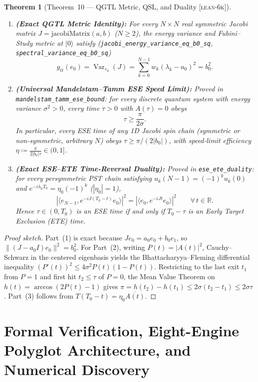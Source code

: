 \documentclass[11pt,reqno]{amsart}
\newtheorem{theorem}{Theorem}[section]
\theoremstyle{definition}
\newcommand{\R}{\mathbb{R}}
\newcommand{\Var}{\operatorname{Var}}
\newcommand{\taglean}{\textsc{[lean-6k]}}
\newcommand{\idb}[1]{\textnormal{\texttt{\footnotesize #1}}}
\newcommand{\ub}{\_\allowbreak}
\begin{document}
\begin{theorem}[Theorem~10 --- QGTL Metric, QSL, and Duality \taglean{}]
\label{thm:qsl}
\leavevmode
\begin{enumerate}
\item \textbf{(Exact QGTL Metric Identity):} For every $N\times N$ real symmetric Jacobi matrix $J=\mathrm{jacobiMatrix}(a,b)$ ($N\ge 2$), the energy variance and Fubini--Study metric at $|0\rangle$ satisfy (\idb{jacobi\ub energy\ub variance\ub eq\ub b0\ub sq}, \idb{spectral\ub variance\ub eq\ub b0\ub sq})
\[
g_{tt}(e_0) = \Var_{e_0}(J) = \sum_{k=0}^{N-1} w_k (\lambda_k - a_0)^2 = b_0^2.
\]
\item \textbf{(Universal Mandelstam--Tamm ESE Speed Limit):} Proved in \idb{mandelstam\ub tamm\ub ese\ub bound}: for every discrete quantum system with energy variance $\sigma^2>0$, every time $\tau>0$ with $A(\tau)=0$ obeys
\[
\tau \ge \frac{\pi}{2\sigma}.
\]
In particular, every ESE time of \emph{any} 1D Jacobi spin chain (symmetric or non-symmetric, arbitrary $N$) obeys $\tau\ge\pi/(2|b_0|)$, with speed-limit efficiency $\eta \coloneqq \frac{\pi}{2|b_0|\tau}\in(0,1]$.
\item \textbf{(Exact ESE--ETE Time-Reversal Duality):} Proved in \idb{ese\ub ete\ub duality}: for every persymmetric PST chain satisfying $u_k(N-1)=(-1)^k u_k(0)$ and $e^{-i\lambda_k T_0}=\eta_0(-1)^k$ ($|\eta_0|=1$),
\[
|\langle e_{N-1}, e^{-iJ(T_0-t)} e_0\rangle|^2 = |\langle e_0, e^{-iJt} e_0\rangle|^2 \qquad \forall\,t\in\R.
\]
Hence $\tau\in(0,T_0)$ is an ESE time if and only if $T_0-\tau$ is an \emph{Early Target Exclusion} (ETE) time.
\end{enumerate}
\end{theorem}

\begin{proof}[Proof sketch]
Part~(1) is exact because $Je_0 = a_0 e_0 + b_0 e_1$, so $\|(J-a_0I)e_0\|^2 = b_0^2$. For Part~(2), writing $P(t)=|A(t)|^2$, Cauchy--Schwarz in the centered eigenbasis yields the Bhattacharyya--Fleming differential inequality $(P'(t))^2 \le 4\sigma^2 P(t)(1-P(t))$. Restricting to the last exit $t_1$ from $P=1$ and first hit $t_2\le\tau$ of $P=0$, the Mean Value Theorem on $h(t)=\arccos(2P(t)-1)$ gives $\pi = h(t_2)-h(t_1) \le 2\sigma(t_2-t_1)\le 2\sigma\tau$. Part~(3) follows from $T(T_0-t)=\eta_0\overline{A(t)}$.
\end{proof}

\section{Formal Verification, Eight-Engine Polyglot Architecture, and Numerical Discovery}
\label{sec:verification}
\end{document}
